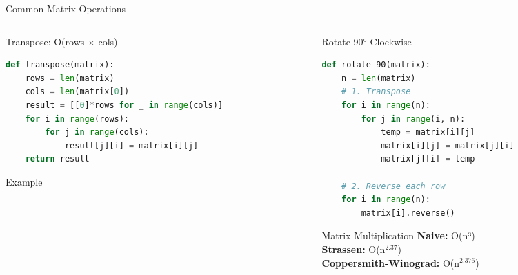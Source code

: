 \documentclass[aspectratio=169,xcolor=dvipsnames]{beamer}
\begin{document}
\begin{frame}[fragile]{Common Matrix Operations}
  \begin{columns}
    \begin{column}{0.48\textwidth}
      \begin{block}{Transpose: O(rows × cols)}
        \begin{lstlisting}[language=Python,basicstyle=\tiny\ttfamily]
def transpose(matrix):
    rows = len(matrix)
    cols = len(matrix[0])
    result = [[0]*rows for _ in range(cols)]
    for i in range(rows):
        for j in range(cols):
            result[j][i] = matrix[i][j]
    return result
        \end{lstlisting}
      \end{block}

      \vspace{0.2cm}

      \begin{exampleblock}{Example}
      \end{exampleblock}
    \end{column}
    \begin{column}{0.48\textwidth}
      \begin{block}{Rotate 90° Clockwise}
        \begin{lstlisting}[language=Python,basicstyle=\tiny\ttfamily,escapechar=@]
def rotate_90(matrix):
    n = len(matrix)
    # 1. Transpose
    for i in range(n):
        for j in range(i, n):
            temp = matrix[i][j]
            matrix[i][j] = matrix[j][i]
            matrix[j][i] = temp

    # 2. Reverse each row
    for i in range(n):
        matrix[i].reverse()
        \end{lstlisting}
      \end{block}

      \vspace{0.2cm}

      \begin{block}{Matrix Multiplication}
        \textbf{Naive:} O(n³) \\
        \textbf{Strassen:} O(n$^{2.37}$) \\
        \textbf{Coppersmith-Winograd:} O(n$^{2.376}$)
      \end{block}
    \end{column}
  \end{columns}
\end{frame}
\end{document}

